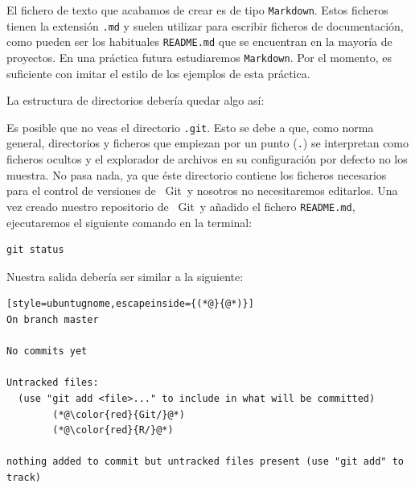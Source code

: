 \documentclass[11pt,a4paper]{article}
\newcommand{\Git}{\textcolor{git}{\faIcon{git-alt}}~\!Git}
\theoremstyle{exercise}
\begin{document}
El fichero de texto que acabamos de crear es de tipo \texttt{Markdown}. Estos ficheros tienen la extensión \texttt{.md} y suelen utilizar para escribir ficheros de documentación, como pueden ser los habituales \texttt{README.md} que se encuentran en la mayoría de proyectos. En una práctica futura estudiaremos \texttt{Markdown}. Por el momento, es suficiente con imitar el estilo de los ejemplos de esta práctica.

La estructura de directorios debería quedar algo así:

\begin{center}
\begin{minipage}{0.75\linewidth}
\end{minipage}
\end{center}

Es posible que no veas el directorio \texttt{.git}. Esto se debe a que, como norma general, directorios y ficheros que empiezan por un punto (\texttt{.}) se interpretan como ficheros ocultos y el explorador de archivos en su configuración por defecto no los muestra. No pasa nada, ya que éste directorio contiene los ficheros necesarios para el control de versiones de \Git\ y nosotros no necesitaremos editarlos. Una vez creado nuestro repositorio de \Git\ y añadido el fichero  \texttt{README.md}, ejecutaremos el siguiente comando en la terminal:

\begin{lstlisting}[style=ubuntugnome]
git status
\end{lstlisting}

\noindent Nuestra salida debería ser similar a la siguiente:

\begin{lstlisting}[style=ubuntugnome,escapeinside={(*@}{@*)}]
On branch master

No commits yet

Untracked files:
  (use "git add <file>..." to include in what will be committed)
        (*@\color{red}{Git/}@*)
        (*@\color{red}{R/}@*)

nothing added to commit but untracked files present (use "git add" to track)
\end{lstlisting}
\end{document}
